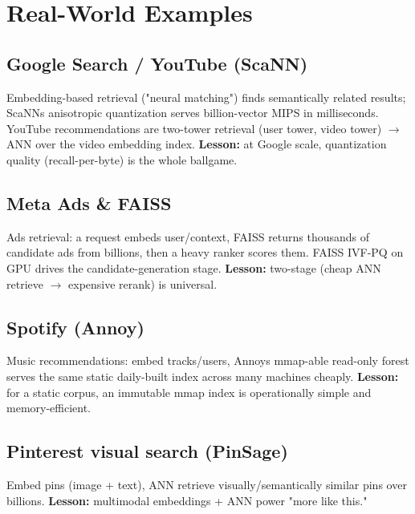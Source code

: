 \documentclass[11pt]{article}
\begin{document}
\section{Real-World Examples}\label{real-world-examples}

\subsection{Google Search / YouTube (ScaNN)}\label{google-search--youtube-scann}

Embedding-based retrieval ("neural matching") finds semantically related results; ScaNN\textquotesingle s anisotropic quantization serves billion-vector MIPS in milliseconds. YouTube recommendations are two-tower retrieval (user tower, video tower) \(\rightarrow\) ANN over the video embedding index. \textbf{Lesson:} at Google scale, quantization quality (recall-per-byte) is the whole ballgame.

\subsection{Meta Ads \& FAISS}\label{meta-ads--faiss}

Ads retrieval: a request embeds user/context, FAISS returns thousands of candidate ads from billions, then a heavy ranker scores them. FAISS IVF-PQ on GPU drives the candidate-generation stage. \textbf{Lesson:} two-stage (cheap ANN retrieve \(\rightarrow\) expensive rerank) is universal.

\subsection{Spotify (Annoy)}\label{spotify-annoy}

Music recommendations: embed tracks/users, Annoy\textquotesingle s mmap-able read-only forest serves the same static daily-built index across many machines cheaply. \textbf{Lesson:} for a static corpus, an immutable mmap index is operationally simple and memory-efficient.

\subsection{Pinterest visual search (PinSage)}\label{pinterest-visual-search-pinsage}

Embed pins (image + text), ANN retrieve visually/semantically similar pins over billions. \textbf{Lesson:} multimodal embeddings + ANN power "more like this."
\end{document}
